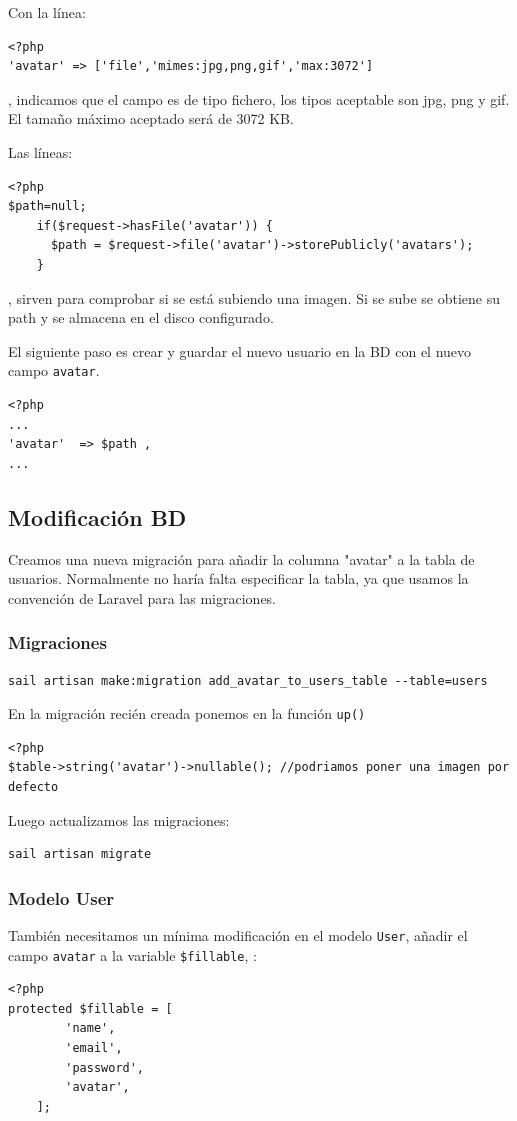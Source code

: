 \documentclass[11pt]{article}
\begin{document}
Con la línea:
\begin{verbatim}
<?php
'avatar' => ['file','mimes:jpg,png,gif','max:3072']
\end{verbatim}

, indicamos que el campo es de tipo fichero, los tipos aceptable son
jpg, png y gif. El tamaño máximo aceptado será de 3072 KB.

Las líneas:
\begin{verbatim}
<?php
$path=null;
    if($request->hasFile('avatar')) {
      $path = $request->file('avatar')->storePublicly('avatars');
    }
\end{verbatim}

, sirven para comprobar si se está subiendo una imagen. Si se sube se
obtiene su path y se almacena en el disco configurado.

El siguiente paso es crear y guardar el nuevo usuario en la BD con el
nuevo campo \texttt{avatar}.
\begin{verbatim}
<?php
...
'avatar'  => $path ,
...
\end{verbatim}


\subsection{Modificación BD}
\label{sec:org0620844}
Creamos una nueva migración para añadir la columna "avatar" a la tabla
de usuarios. Normalmente no haría falta especificar la tabla, ya que
usamos la convención de Laravel para las migraciones.

\subsubsection{Migraciones}
\label{sec:org7c884e0}
\begin{verbatim}
sail artisan make:migration add_avatar_to_users_table --table=users
\end{verbatim}

En la migración recién creada ponemos en la función \texttt{up()}
\begin{verbatim}
<?php
$table->string('avatar')->nullable(); //podriamos poner una imagen por defecto
\end{verbatim}

Luego actualizamos las migraciones:
\begin{verbatim}
sail artisan migrate
\end{verbatim}

\subsubsection{Modelo User}
\label{sec:org8b2bed3}
También necesitamos un mínima modificación en el modelo \texttt{User},
añadir el campo \texttt{avatar} a la variable \texttt{\$fillable}, :
\begin{verbatim}
<?php
protected $fillable = [
        'name',
        'email',
        'password',
        'avatar',
    ];
\end{verbatim}
\end{document}
